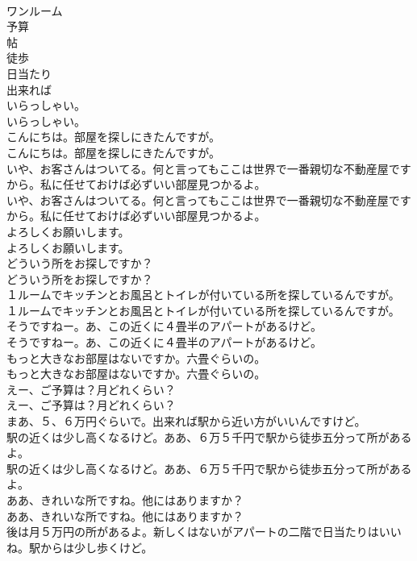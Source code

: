 \documentclass[8pt]{extreport}
\begin{document}
\begin{CJK}{UTF8}{min}
\\	ワンルーム
\\	予算
\\	帖
\\	徒歩
\\	日当たり
\\	出来れば
\\	いらっしゃい。	
\\	いらっしゃい。 
\\	こんにちは。部屋を探しにきたんですが。	
\\	こんにちは。部屋を探しにきたんですが。 
\\	いや、お客さんはついてる。何と言ってもここは世界で一番親切な不動産屋ですから。私に任せておけば必ずいい部屋見つかるよ。	
\\	いや、お客さんはついてる。何と言ってもここは世界で一番親切な不動産屋ですから。私に任せておけば必ずいい部屋見つかるよ。 
\\	よろしくお願いします。	
\\	よろしくお願いします。 
\\	どういう所をお探しですか？	
\\	どういう所をお探しですか？ 
\\	１ルームでキッチンとお風呂とトイレが付いている所を探しているんですが。	
\\	１ルームでキッチンとお風呂とトイレが付いている所を探しているんですが。 
\\	そうですねー。あ、この近くに４畳半のアパートがあるけど。	
\\	そうですねー。あ、この近くに４畳半のアパートがあるけど。 
\\	もっと大きなお部屋はないですか。六畳ぐらいの。	
\\	もっと大きなお部屋はないですか。六畳ぐらいの。 
\\	えー、ご予算は？月どれくらい？	
\\	えー、ご予算は？月どれくらい？ 
\\	まあ、５、６万円ぐらいで。出来れば駅から近い方がいいんですけど。 
\\	駅の近くは少し高くなるけど。ああ、６万５千円で駅から徒歩五分って所があるよ。	
\\	駅の近くは少し高くなるけど。ああ、６万５千円で駅から徒歩五分って所があるよ。 
\\	ああ、きれいな所ですね。他にはありますか？	
\\	ああ、きれいな所ですね。他にはありますか？ 
\\	後は月５万円の所があるよ。新しくはないがアパートの二階で日当たりはいいね。駅からは少し歩くけど。	

\end{CJK}
\end{document}
